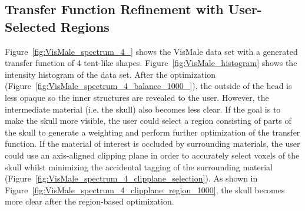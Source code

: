 \subsection{Transfer Function Refinement with User-Selected Regions}
Figure~\ref{fig:VisMale_spectrum_4_} shows the VisMale data set with a generated transfer function of 4 tent-like shapes. Figure~\ref{fig:VisMale_histogram} shows the intensity histogram of the data set.
After the optimization (Figure~\ref{fig:VisMale_spectrum_4_balance_1000_}), the outside of the head is less opaque so the inner structures are revealed to the user. However, the intermediate material (i.e. the skull) also becomes less clear. If the goal is to make the skull more visible, the user could select a region consisting of parts of the skull to generate a weighting and perform further optimization of the transfer function. If the material of interest is occluded by surrounding materials, the user could use an axis-aligned clipping plane in order to accurately select voxels of the skull whilst minimizing the accidental tagging of the surrounding material (Figure~\ref{fig:VisMale_spectrum_4_clipplane_selection}).
As shown in Figure~\ref{fig:VisMale_spectrum_4_clipplane_region_1000}, the skull becomes more clear after the region-based optimization.

%

